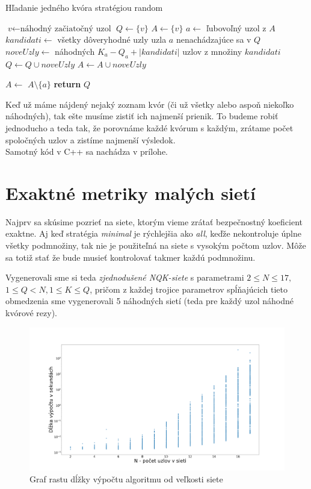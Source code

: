 \begin{algorithm}
\caption{Hľadanie jedného kvóra stratégiou random}\label{alg:randomstrategy}
\begin{algorithmic}[1]
\State $\textit{v} \gets \text{náhodný začiatočný uzol}$
\State $Q \gets \{v\}$
\State $A \gets \{v\}$
  \State $a \gets$ ľubovoľný uzol z $A$
  \State $kandidati \gets$ všetky dôveryhodné uzly uzla $a$ nenachádzajúce sa v $Q$
    \State $noveUzly \gets$ náhodných $K_a - Q_a + |kandidati|$ uzlov z množiny $kandidati$
    \State $Q \gets Q \cup noveUzly$
    \State $A \gets A \cup noveUzly$
  \EndIf

  \State $A \gets$ $A \setminus\{a\}$
\EndWhile
\State \textbf{return} $Q$
\end{algorithmic}
\end{algorithm}

Keď už máme nájdený nejaký zoznam kvór (či už všetky alebo aspoň niekoľko náhodných),
tak ešte musíme zistiť ich najmenší prienik. To budeme robiť jednoducho a teda tak,
že porovnáme každé kvórum s každým, zrátame počet spoločných uzlov a zistíme
najmenší výsledok.\\
Samotný kód v C++ sa nachádza v prílohe.

\section {Exaktné metriky malých sietí}

Najprv sa skúsime pozrieť na siete, ktorým vieme zrátať bezpečnostný koeficient
exaktne. 
Aj keď stratégia \textit{minimal} je rýchlejšia ako \textit{all}, keďže nekontroluje
úplne všetky podmnožiny, tak nie je použiteľná na siete s vysokým počtom uzlov.
Môže sa totiž stať že bude musieť kontrolovať takmer každú podmnožinu.

Vygenerovali sme si teda \textit{zjednodušené NQK-siete} s parametrami
$2\leq N\leq 17,$\\
$1\leq Q < N, 1\leq K\leq Q$, pričom z každej trojice parametrov
spĺňajúcich tieto obmedzenia sme vygenerovali 5 náhodných sietí (teda pre každý
uzol náhodné kvórové rezy).

\begin{figure}
\centerline{\includegraphics[width=1.2\textwidth]{images/cas_ku_N.png}}
\caption{Graf rastu dĺžky výpočtu algoritmu od veľkosti siete} \label{obr:cas_velkost}
\end{figure}


